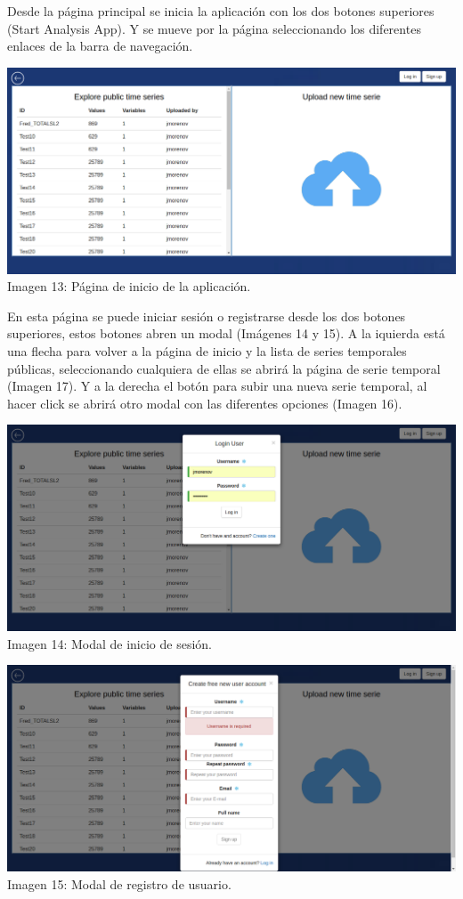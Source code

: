 \documentclass[14pt]{extarticle}
\theoremstyle{definition}
\theoremstyle{remark}
\begin{document}
Desde la página principal se inicia la aplicación con los dos botones superiores (Start Analysis App). Y se mueve por la página seleccionando los diferentes enlaces de la barra de navegación.
\begin{center}
\includegraphics[scale=0.35]{AnalysisPage.png}
\\Imagen 13: Página de inicio de la aplicación.
\end{center}
En esta página se puede iniciar sesión o registrarse desde los dos botones superiores, estos botones abren un modal (Imágenes 14 y 15). A la iquierda está una flecha para volver a la página de inicio y la lista de series temporales públicas, seleccionando cualquiera de ellas se abrirá la página de serie temporal (Imagen 17). Y a la derecha el botón para subir una nueva serie temporal, al hacer click se abrirá otro modal con las diferentes opciones (Imagen 16).

\begin{center}
\includegraphics[scale=0.35]{LoginUser.png}
\\Imagen 14: Modal de inicio de sesión.
\end{center}

\begin{center}
\includegraphics[scale=0.35]{RegisterUser.png}
\\Imagen 15: Modal de registro de usuario.
\end{center}
\end{document}
